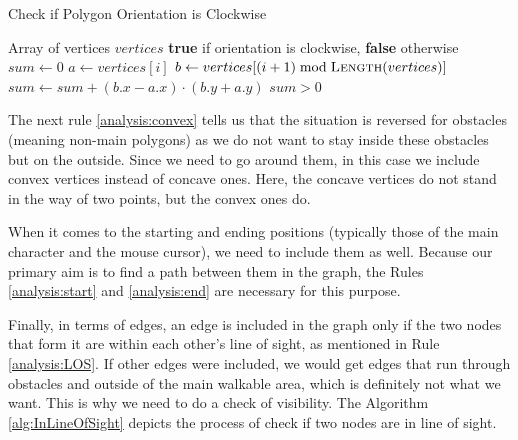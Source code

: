 \begin{algorithm}[H]
\caption{Check if Polygon Orientation is Clockwise}\label{alg:IsOrientationClockwise}
\begin{algorithmic}[1]
\Require Array of vertices $vertices$
\Ensure \textbf{true} if orientation is clockwise, \textbf{false} otherwise
\Statex
{}
    \State $sum \gets 0$
        \State $a \gets vertices[i]$
        \State $b \gets vertices[(i + 1) \bmod \Call{Length}{vertices}]$
        \State $sum \gets sum + (b.x - a.x) \cdot (b.y + a.y)$
    \EndFor
    \State \Return $sum > 0$
\EndFunction
\end{algorithmic}
\end{algorithm}

The next rule \ref{analysis:convex} tells us that the situation is reversed for obstacles (meaning non-main polygons) as we do not want to stay inside these obstacles but on the outside. Since we need to go around them, in this case we include convex vertices instead of concave ones. Here, the concave vertices do not stand in the way of two points, but the convex ones do. 

When it comes to the starting and ending positions (typically those of the main character and the mouse cursor), we need to include them as well. Because our primary aim is to find a path between them in the graph, the Rules \ref{analysis:start} and \ref{analysis:end} are necessary for this purpose.

Finally, in terms of edges, an edge is included in the graph only if the two nodes that form it are within each other's line of sight, as mentioned in Rule \ref{analysis:LOS}. If other edges were included, we would get edges that run through obstacles and outside of the main walkable area, which is definitely not what we want. This is why we need to do a check of visibility. The Algorithm \ref{alg:InLineOfSight} depicts the process of check if two nodes are in line of sight. 

